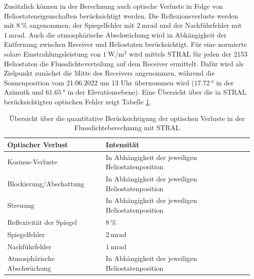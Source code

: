 Zusätzlich können in der Berechnung auch optische Verluste in Folge von Heliostateneigenschaften berücksichtigt werden.
Die Reflexionsverluste werden mit $\SI{8}{\percent}$ angenommen, der Spiegelfehler mit $\SI{2}{\milli\radian}$ und der Nachführfehler mit $\SI{1}{\milli\radian}$.
Auch die atmosphärische Abschwächung wird in Abhängigkeit der Entfernung zwischen Receiver und Heliostaten berücksichtigt.
Für eine normierte solare Einstrahlungsleistung von $\SI{1}{\watt\per\metre\squared}$ wird mittels STRAL für jeden der 2153 Heliostaten die Flussdichteverteilung auf dem Receiver ermittelt.
Dafür wird als Zielpunkt zunächst die Mitte des Receivers angenommen, während die Sonnenposition vom 21.06.2022 um 13 Uhr übernommen wird ($\SI{17.72}{\degree}$ in der Azimuth und $\SI{61.65}{\degree}$ in der Elevationsebene).
Eine Übersicht über die in STRAL berücksichtigten optischen Fehler zeigt Tabelle \ref{tab_optischeVerlustequantität}.

\begingroup
\renewcommand{\arraystretch}{1.2}
\begin{table}[ht!]
    \caption[Übersicht über die quantitative Berücksichtigung der optischen Verluste in der Flussdichteberechnung mit STRAL]{Übersicht über die quantitative Berücksichtigung der optischen Verluste in der Flussdichteberechnung mit STRAL}
    \centering
    \begin{tabular}{m{}m{}}
        \rowcolor{white}
        \toprule
        Optischer Verlust           & Intensität                                         \\
        \midrule
        Kosinus-Verluste            & In Abhängigkeit der jeweiligen Heliostatenposition \\
        Blockierung/Abschattung     & In Abhängigkeit der jeweiligen Heliostatenposition \\
        Streuung                    & In Abhängigkeit der jeweiligen Heliostatenposition \\
        Reflexivität der Spiegel    & $\SI{8}{\percent}$                                 \\
        Spiegelfehler               & $\SI{2}{\milli\radian}$                            \\
        Nachführfehler              & $\SI{1}{\milli\radian}$                            \\
        Atmosphärische Abschwächung & In Abhängigkeit der jeweiligen Heliostatenposition \\
        \toprule
    \end{tabular}
    \label{tab_optischeVerlustequantität}
\end{table}
\endgroup

